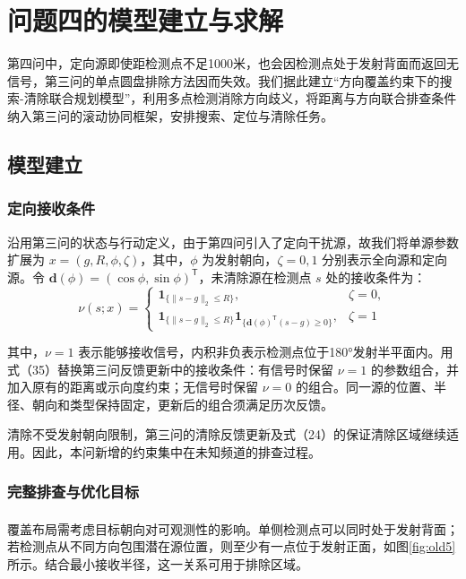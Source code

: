 \section{问题四的模型建立与求解}

第四问中，定向源即使距检测点不足1000米，也会因检测点处于发射背面而返回无信号，第三问的单点圆盘排除方法因而失效。我们据此建立``方向覆盖约束下的搜索-清除联合规划模型''，利用多点检测消除方向歧义，将距离与方向联合排查条件纳入第三问的滚动协同框架，安排搜索、定位与清除任务。

\subsection{模型建立}

\subsubsection{定向接收条件}

沿用第三问的状态与行动定义，由于第四问引入了定向干扰源，故我们将单源参数扩展为 \(x=(g,R,\phi,\zeta)\)，其中，\(\phi\) 为发射朝向，\(\zeta=0,1\) 分别表示全向源和定向源。令 \(\boldsymbol d(\phi)=(\cos\phi,\sin\phi)^{\mathsf T}\)，未清除源在检测点 \(s\) 处的接收条件为：
\[
\nu(s;x)=
\begin{cases}
\mathbf 1_{\{\|s-g\|_2\le R\}},&\zeta=0,\\
\mathbf 1_{\{\|s-g\|_2\le R\}}\mathbf 1_{\{\boldsymbol d(\phi)^{\mathsf T}(s-g)\ge0\}},&\zeta=1
\end{cases}
\tag{35}
\]

其中，\(\nu=1\) 表示能够接收信号，内积非负表示检测点位于180°发射半平面内。用式（35）替换第三问反馈更新中的接收条件：有信号时保留 \(\nu=1\) 的参数组合，并加入原有的距离或示向度约束；无信号时保留 \(\nu=0\) 的组合。同一源的位置、半径、朝向和类型保持固定，更新后的组合须满足历次反馈。

清除不受发射朝向限制，第三问的清除反馈更新及式（24）的保证清除区域继续适用。因此，本问新增的约束集中在未知频道的排查过程。

\subsubsection{完整排查与优化目标}

覆盖布局需考虑目标朝向对可观测性的影响\textsuperscript{\cite{ref6}}。单侧检测点可以同时处于发射背面；若检测点从不同方向包围潜在源位置，则至少有一点位于发射正面，如图\ref{fig:old5}所示。结合最小接收半径，这一关系可用于排除区域。

